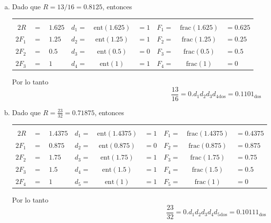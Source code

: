 \begin{solucion}
\begin{enumerate}[(a)]
  \item Dado que $R = 13/16 = 0.8125$, entonces
  \begin{center}
   \begin{tabular}{rclrclrcl}
    & & & \hspace{1.5cm} & & \hspace{1.5cm} \\
    $2R$ & $=$ & $1.625$ & $d_1 =$ & $\text{ent}(1.625)$ & $=1$ & $F_1 =$ & $\text{frac}(1.625)$ & $=0.625$ \\
    $2F_1$ & $=$ & $1.25$ & $d_2 =$ & $\text{ent}(1.25)$ & $=1$ & $F_2 =$ & $\text{frac}(1.25)$ & $=0.25$ \\
    $2F_2$ & $=$ & $0.5$ & $d_3 =$ & $\text{ent}(0.5)$ & $=0$ & $F_3 =$ & $\text{frac}(0.5)$ & $=0.5$ \\
    $2F_3$ & $=$ & $1$ & $d_4 =$ & $\text{ent}(1)$ & $=1$ & $F_4 =$ & $\text{frac}(1)$ & $=0$ \\
   \end{tabular}
  \end{center}
  Por lo tanto
  \begin{equation*}
   \frac{13}{16} = 0.d_1d_2d_3d_4{}_{\text{dos}} = 0.1101_{\text{dos}}
  \end{equation*}

  \item Dado que $R = \frac{23}{32} = 0.71875$, entonces
  \begin{center}
   \begin{tabular}{rclrclrcl}
    & & & \hspace{1.5cm} & & \hspace{1.5cm} \\
    $2R$ & $=$ & $1.4375$ & $d_1 =$ & $\text{ent}(1.4375)$ & $=1$ & $F_1 =$ & $\text{frac}(1.4375)$ & $=0.4375$ \\
    $2F_1$ & $=$ & $0.875$ & $d_2 =$ & $\text{ent}(0.875)$ & $=0$ & $F_2 =$ & $\text{frac}(0.875)$ & $=0.875$ \\
    $2F_2$ & $=$ & $1.75$ & $d_3 =$ & $\text{ent}(1.75)$ & $=1$ & $F_3 =$ & $\text{frac}(1.75)$ & $=0.75$ \\
    $2F_3$ & $=$ & $1.5$ & $d_4 =$ & $\text{ent}(1.5)$ & $=1$ & $F_4 =$ & $\text{frac}(1.5)$ & $=0.5$ \\
    $2F_4$ & $=$ & $1$ & $d_5 =$ & $\text{ent}(1)$ & $=1$ & $F_5 =$ & $\text{frac}(1)$ & $=0$ \\
   \end{tabular}
  \end{center}
  Por lo tanto
  \begin{equation*}
   \frac{23}{32} = 0.d_1d_2d_3d_4d_5{}_{\text{dos}} = 0.10111_{\text{dos}}
  \end{equation*}


\end{enumerate}
\end{solucion}
